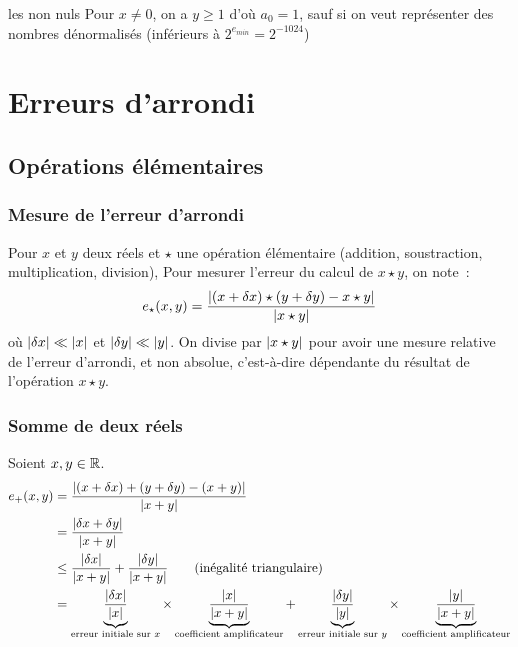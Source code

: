 \begin{remarque}{}{les non nuls}
    Pour $x\neq 0$, on a $y\geq 1$ d'où $a_0 = 1$, sauf si on veut représenter des nombres dénormalisés (inférieurs à  $2^{e_{min}}=2^{-1024}$)
\end{remarque}


\newcommand{\dx}{\delta x}
\newcommand{\dy}{\delta y}
\newcommand{\fracabs}[2]{\frac{\abs{#1}}{\abs{#2}}}
\section{Erreurs d'arrondi}
\subsection{Opérations élémentaires}
\subsubsection{Mesure de l'erreur d'arrondi}
Pour $x$ et $y$ deux réels et $\star$ une opération élémentaire (addition, soustraction, multiplication, division), Pour mesurer l'erreur du calcul de $x \star y$, on note~:
$$e_\star(x,y) = \fracabs{(x + \dx)\star(y+\dy) - x \star y}{x\star y}$$
où $|\delta x| \ll |x|$ et $|\delta y| \ll |y|$.
On divise par $|x \star y|$ pour avoir une mesure relative de l'erreur d'arrondi, et non absolue, c'est-à-dire dépendante du résultat de l'opération $x \star y$.
\subsubsection{Somme de deux réels}
Soient $x,y \in \mathbb{R}$. 
\begin{align*}
e_+(x,y) &= \frac{\abs{(x+\delta x) + (y + \delta y) - (x+y)}}{\abs{x+y}}\\
  &= \frac{\abs{\delta x + \delta y}}{\abs{x+y}}\\
  &\le \frac{\abs{\delta x}}{\abs{x+y}} + \frac{\abs{\delta y}}{\abs{x+y}}
     \qquad\text{(inégalité triangulaire)}\\
  &= \underbrace{\fracabs{\dx}{x}}_{\text{erreur initiale sur $x$}}
     \times \underbrace{\frac{\abs{x}}{\abs{x+y}}}_{\text{coefficient amplificateur}}
   + \underbrace{\fracabs{\dy}{y}}_{\text{erreur initiale sur $y$}}
     \times \underbrace{\frac{\abs{y}}{\abs{x+y}}}_{\text{coefficient amplificateur}}
\end{align*}


